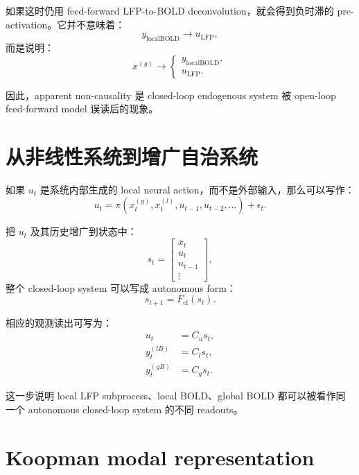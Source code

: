 \documentclass[11pt,a4paper]{ctexart}
\begin{document}
如果这时仍用 feed-forward LFP-to-BOLD deconvolution，就会得到负时滞的 pre-activation。它并不意味着：
\begin{equation}
    y_{\mathrm{localBOLD}} \rightarrow u_{\mathrm{LFP}},
\end{equation}
而是说明：
\begin{equation}
    x^{(g)} \rightarrow
    \begin{cases}
    y_{\mathrm{localBOLD}},\\
    u_{\mathrm{LFP}}.
    \end{cases}
\end{equation}

因此，apparent non-causality 是 closed-loop endogenous system 被 open-loop feed-forward model 误读后的现象。

\section{从非线性系统到增广自治系统}

如果 $u_t$ 是系统内部生成的 local neural action，而不是外部输入，那么可以写作：
\begin{equation}
    u_t = \pi\!\left(x_t^{(g)},x_t^{(l)},u_{t-1},u_{t-2},\ldots\right)+\epsilon_t.
\end{equation}

把 $u_t$ 及其历史增广到状态中：
\begin{equation}
    s_t =
    \begin{bmatrix}
    x_t \\
    u_t \\
    u_{t-1} \\
    \vdots
    \end{bmatrix},
\end{equation}
整个 closed-loop system 可以写成 autonomous form：
\begin{equation}
    s_{t+1}=F_{\mathrm{cl}}(s_t).
\end{equation}

相应的观测读出可写为：
\begin{align}
    u_t &= C_u s_t, \\
    y_t^{(lB)} &= C_l s_t, \\
    y_t^{(gB)} &= C_g s_t.
\end{align}

这一步说明 local LFP subprocess、local BOLD、global BOLD 都可以被看作同一个 autonomous closed-loop system 的不同 readouts。

\section{Koopman modal representation}
\end{document}

